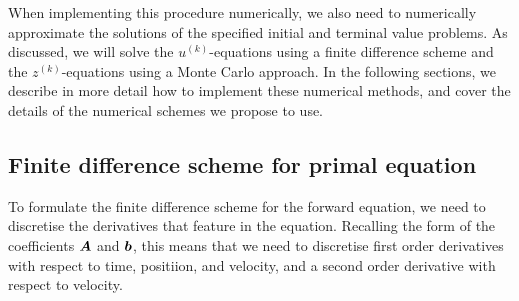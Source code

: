 When implementing this procedure numerically, we also need to numerically approximate the solutions of the specified initial and terminal value problems. As discussed, we will solve the $u^{(k)}$-equations using a finite difference scheme and the $z^{(k)}$-equations using a Monte Carlo approach. In the following sections, we describe in more detail how to implement these numerical methods, and cover the details of the numerical schemes we propose to use.

\subsection{Finite difference scheme for primal equation}

To formulate the finite difference scheme for the forward equation, we need to discretise the derivatives that feature in the equation. Recalling the form of the coefficients $\boldsymbol{A}$ and $\boldsymbol{b}$, this means that we need to discretise first order derivatives with respect to time, positiion, and velocity, and a second order derivative with respect to velocity.

